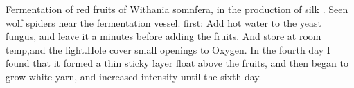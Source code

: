 Fermentation of red fruits of Withania somnfera, in the production of silk .
Seen wolf spiders near the fermentation vessel.
first: Add hot water to the yeast fungus, and leave it a minutes before adding the fruits. And store at room temp,and the light.Hole cover small openings to Oxygen. 
In the fourth day I found that it formed a thin sticky layer float above the fruits, and then began to grow white yarn, and increased intensity until the sixth day.  